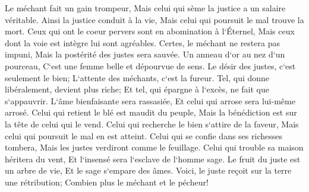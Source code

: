 \verse Le méchant fait un gain trompeur, Mais celui qui sème la justice a un salaire véritable. 
\verse Ainsi la justice conduit à la vie, Mais celui qui poursuit le mal trouve la mort. 
\verse Ceux qui ont le coeur pervers sont en abomination à l`Éternel, Mais ceux dont la voie est intègre lui sont agréables. 
\verse Certes, le méchant ne restera pas impuni, Mais la postérité des justes sera sauvée. 
\verse Un anneau d`or au nez d`un pourceau, C`est une femme belle et dépourvue de sens. 
\verse Le désir des justes, c`est seulement le bien; L`attente des méchants, c`est la fureur. 
\verse Tel, qui donne libéralement, devient plus riche; Et tel, qui épargne à l`excès, ne fait que s`appauvrir. 
\verse L`âme bienfaisante sera rassasiée, Et celui qui arrose sera lui-même arrosé. 
\verse Celui qui retient le blé est maudit du peuple, Mais la bénédiction est sur la tête de celui qui le vend. 
\verse Celui qui recherche le bien s`attire de la faveur, Mais celui qui poursuit le mal en est atteint. 
\verse Celui qui se confie dans ses richesses tombera, Mais les justes verdiront comme le feuillage. 
\verse Celui qui trouble sa maison héritera du vent, Et l`insensé sera l`esclave de l`homme sage. 
\verse Le fruit du juste est un arbre de vie, Et le sage s`empare des âmes. 
\verse Voici, le juste reçoit sur la terre une rétribution; Combien plus le méchant et le pécheur! 

